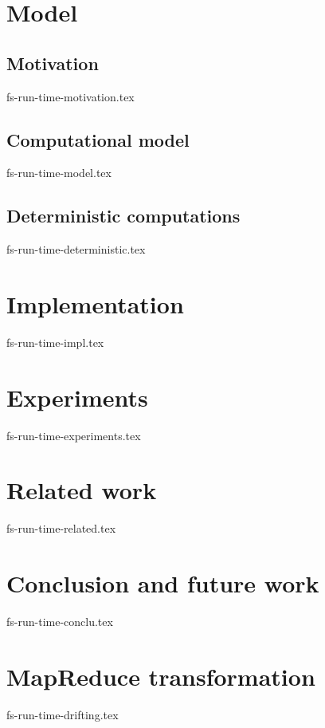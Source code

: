 \documentclass{llncs}
\begin{document}
\section {Model}
\label {fs-model}

\subsection {Motivation}
 {fs-run-time-motivation.tex}

\subsection {Computational model}
 {fs-run-time-model.tex}


\subsection {Deterministic computations}
 {fs-run-time-deterministic.tex}

\section {Implementation}
 {fs-run-time-impl.tex}

\section {Experiments}
 {fs-run-time-experiments.tex}

\section {Related work}
 {fs-run-time-related.tex}

\section {Conclusion and future work}
 {fs-run-time-conclu.tex}




\appendix
\section{MapReduce transformation}
 {fs-run-time-drifting.tex}
\end{document}
